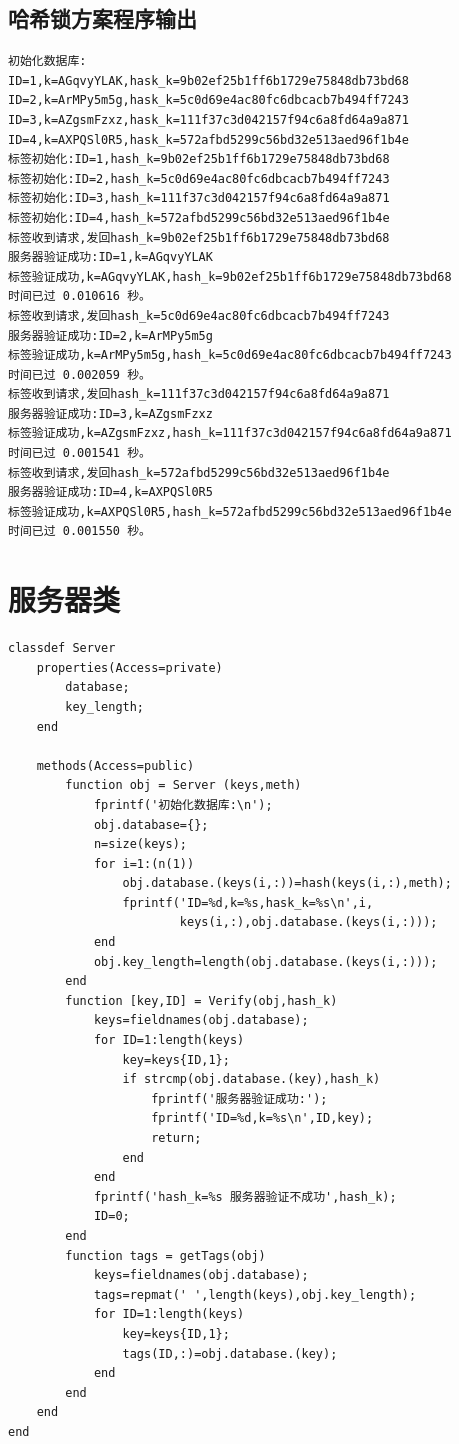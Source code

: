 \documentclass[a4paper]{ctexart}
\begin{document}
\subsection{哈希锁方案程序输出}
\begin{lstlisting}
初始化数据库:
ID=1,k=AGqvyYLAK,hask_k=9b02ef25b1ff6b1729e75848db73bd68
ID=2,k=ArMPy5m5g,hask_k=5c0d69e4ac80fc6dbcacb7b494ff7243
ID=3,k=AZgsmFzxz,hask_k=111f37c3d042157f94c6a8fd64a9a871
ID=4,k=AXPQSl0R5,hask_k=572afbd5299c56bd32e513aed96f1b4e
标签初始化:ID=1,hash_k=9b02ef25b1ff6b1729e75848db73bd68
标签初始化:ID=2,hash_k=5c0d69e4ac80fc6dbcacb7b494ff7243
标签初始化:ID=3,hash_k=111f37c3d042157f94c6a8fd64a9a871
标签初始化:ID=4,hash_k=572afbd5299c56bd32e513aed96f1b4e
标签收到请求,发回hash_k=9b02ef25b1ff6b1729e75848db73bd68
服务器验证成功:ID=1,k=AGqvyYLAK
标签验证成功,k=AGqvyYLAK,hash_k=9b02ef25b1ff6b1729e75848db73bd68
时间已过 0.010616 秒。
标签收到请求,发回hash_k=5c0d69e4ac80fc6dbcacb7b494ff7243
服务器验证成功:ID=2,k=ArMPy5m5g
标签验证成功,k=ArMPy5m5g,hash_k=5c0d69e4ac80fc6dbcacb7b494ff7243
时间已过 0.002059 秒。
标签收到请求,发回hash_k=111f37c3d042157f94c6a8fd64a9a871
服务器验证成功:ID=3,k=AZgsmFzxz
标签验证成功,k=AZgsmFzxz,hash_k=111f37c3d042157f94c6a8fd64a9a871
时间已过 0.001541 秒。
标签收到请求,发回hash_k=572afbd5299c56bd32e513aed96f1b4e
服务器验证成功:ID=4,k=AXPQSl0R5
标签验证成功,k=AXPQSl0R5,hash_k=572afbd5299c56bd32e513aed96f1b4e
时间已过 0.001550 秒。
\end{lstlisting}

\newpage
\appendix
\appendixpage
\section{服务器类}
\begin{lstlisting}
classdef Server
    properties(Access=private)
        database;
        key_length;
    end
    
    methods(Access=public)
        function obj = Server (keys,meth)
            fprintf('初始化数据库:\n');
            obj.database={};
            n=size(keys);
            for i=1:(n(1))
                obj.database.(keys(i,:))=hash(keys(i,:),meth);
                fprintf('ID=%d,k=%s,hask_k=%s\n',i,
                        keys(i,:),obj.database.(keys(i,:)));
            end
            obj.key_length=length(obj.database.(keys(i,:)));
        end
        function [key,ID] = Verify(obj,hash_k)
            keys=fieldnames(obj.database);
            for ID=1:length(keys)
                key=keys{ID,1};
                if strcmp(obj.database.(key),hash_k)
                    fprintf('服务器验证成功:');
                    fprintf('ID=%d,k=%s\n',ID,key);
                    return;
                end
            end
            fprintf('hash_k=%s 服务器验证不成功',hash_k);
            ID=0;
        end
        function tags = getTags(obj)
            keys=fieldnames(obj.database);
            tags=repmat(' ',length(keys),obj.key_length);
            for ID=1:length(keys)
                key=keys{ID,1};
                tags(ID,:)=obj.database.(key);
            end
        end
    end
end
\end{lstlisting}
\end{document}
